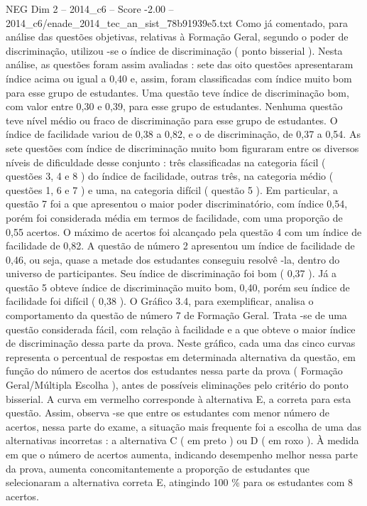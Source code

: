 \begin{textsample}{NEG Dim 2 – 2014\_c6 – Score -2.00 – 2014\_c6/enade\_2014\_tec\_an\_sist\_78b91939e5.txt}
Como já comentado, para análise das questões objetivas, relativas à Formação Geral, segundo o poder de discriminação, utilizou -se o índice de discriminação ( ponto bisserial ).
Nesta análise, as questões foram assim avaliadas : sete das oito questões apresentaram índice acima ou igual a 0,40 e, assim, foram classificadas com índice muito bom para esse grupo de estudantes.
Uma questão teve índice de discriminação bom, com valor entre 0,30 e 0,39, para esse grupo de estudantes.
Nenhuma questão teve nível médio ou fraco de discriminação para esse grupo de estudantes.
O índice de facilidade variou de 0,38 a 0,82, e o de discriminação, de 0,37 a 0,54.
As sete questões com índice de discriminação muito bom figuraram entre os diversos níveis de dificuldade desse conjunto : três classificadas na categoria fácil ( questões 3, 4 e 8 ) do índice de facilidade, outras três, na categoria médio ( questões 1, 6 e 7 ) e uma, na categoria difícil ( questão 5 ).
Em particular, a questão 7 foi a que apresentou o maior poder discriminatório, com índice 0,54, porém foi considerada média em termos de facilidade, com uma proporção de 0,55 acertos.
O máximo de acertos foi alcançado pela questão 4 com um índice de facilidade de 0,82.
A questão de número 2 apresentou um índice de facilidade de 0,46, ou seja, quase a metade dos estudantes conseguiu resolvê -la, dentro do universo de participantes.
Seu índice de discriminação foi bom ( 0,37 ).
Já a questão 5 obteve índice de discriminação muito bom, 0,40, porém seu índice de facilidade foi difícil ( 0,38 ).
O Gráfico 3.4, para exemplificar, analisa o comportamento da questão de número 7 de Formação Geral.
Trata -se de uma questão considerada fácil, com relação à facilidade e a que obteve o maior índice de discriminação dessa parte da prova.
Neste gráfico, cada uma das cinco curvas representa o percentual de respostas em determinada alternativa da questão, em função do número de acertos dos estudantes nessa parte da prova ( Formação Geral/Múltipla Escolha ), antes de possíveis eliminações pelo critério do ponto bisserial.
A curva em vermelho corresponde à alternativa E, a correta para esta questão.
Assim, observa -se que entre os estudantes com menor número de acertos, nessa parte do exame, a situação mais frequente foi a escolha de uma das alternativas incorretas : a alternativa C ( em preto ) ou D ( em roxo ).
À medida em que o número de acertos aumenta, indicando desempenho melhor nessa parte da prova, aumenta concomitantemente a proporção de estudantes que selecionaram a alternativa correta E, atingindo 100 \% para os estudantes com 8 acertos.

\end{textsample}
